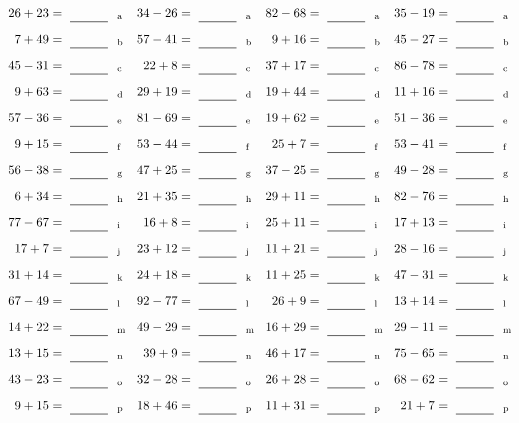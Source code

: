 \documentclass
[
  draft    = true,
  fontsize = 11pt,
  parskip  = half-
]
{scrartcl}
\begin{document}
\clearpage
\begin{align*}
    \pline{26+23}&=\rline{a}
  & \pline{34-26}&=\rline{a}
  & \pline{82-68}&=\rline{a}
  & \pline{35-19}&=\rline{a} \\[1ex]
    \pline{7+49}&=\rline{b}
  & \pline{57-41}&=\rline{b}
  & \pline{9+16}&=\rline{b}
  & \pline{45-27}&=\rline{b} \\[1ex]
    \pline{45-31}&=\rline{c}
  & \pline{22+8}&=\rline{c}
  & \pline{37+17}&=\rline{c}
  & \pline{86-78}&=\rline{c} \\[1ex]
    \pline{9+63}&=\rline{d}
  & \pline{29+19}&=\rline{d}
  & \pline{19+44}&=\rline{d}
  & \pline{11+16}&=\rline{d} \\[1ex]
    \pline{57-36}&=\rline{e}
  & \pline{81-69}&=\rline{e}
  & \pline{19+62}&=\rline{e}
  & \pline{51-36}&=\rline{e} \\[1ex]
    \pline{9+15}&=\rline{f}
  & \pline{53-44}&=\rline{f}
  & \pline{25+7}&=\rline{f}
  & \pline{53-41}&=\rline{f} \\[1ex]
    \pline{56-38}&=\rline{g}
  & \pline{47+25}&=\rline{g}
  & \pline{37-25}&=\rline{g}
  & \pline{49-28}&=\rline{g} \\[1ex]
    \pline{6+34}&=\rline{h}
  & \pline{21+35}&=\rline{h}
  & \pline{29+11}&=\rline{h}
  & \pline{82-76}&=\rline{h} \\[1ex]
    \pline{77-67}&=\rline{i}
  & \pline{16+8}&=\rline{i}
  & \pline{25+11}&=\rline{i}
  & \pline{17+13}&=\rline{i} \\[1ex]
    \pline{17+7}&=\rline{j}
  & \pline{23+12}&=\rline{j}
  & \pline{11+21}&=\rline{j}
  & \pline{28-16}&=\rline{j} \\[1ex]
    \pline{31+14}&=\rline{k}
  & \pline{24+18}&=\rline{k}
  & \pline{11+25}&=\rline{k}
  & \pline{47-31}&=\rline{k} \\[1ex]
    \pline{67-49}&=\rline{l}
  & \pline{92-77}&=\rline{l}
  & \pline{26+9}&=\rline{l}
  & \pline{13+14}&=\rline{l} \\[1ex]
    \pline{14+22}&=\rline{m}
  & \pline{49-29}&=\rline{m}
  & \pline{16+29}&=\rline{m}
  & \pline{29-11}&=\rline{m} \\[1ex]
    \pline{13+15}&=\rline{n}
  & \pline{39+9}&=\rline{n}
  & \pline{46+17}&=\rline{n}
  & \pline{75-65}&=\rline{n} \\[1ex]
    \pline{43-23}&=\rline{o}
  & \pline{32-28}&=\rline{o}
  & \pline{26+28}&=\rline{o}
  & \pline{68-62}&=\rline{o} \\[1ex]
    \pline{9+15}&=\rline{p}
  & \pline{18+46}&=\rline{p}
  & \pline{11+31}&=\rline{p}
  & \pline{21+7}&=\rline{p}
\end{align*}
\end{document}
